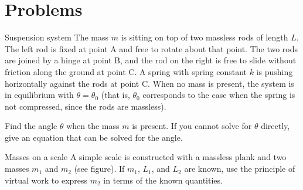 %
\section{Problems}
\begin{problem}{Suspension system}
The mass $m$ is sitting on top of two massless rods of length $L$. The left rod is fixed at point A and free to rotate about that point. The two rods are joined by a hinge at point B, and the rod on the right is free to slide without friction along the ground at point C. A spring with spring constant $k$ is pushing horizontally against the rods at point C. When no mass is present, the system is in equilibrium with $\theta= \theta_0$ (that is, $\theta_0$ corresponds to the case when the spring is not compressed, since the rods are massless).

Find the angle $\theta$ when the mass $m$ is present. If you cannot solve for $\theta$ directly, give an equation that can be solved for the angle.
\\
\label{prob_VirtWork_1}
\end{problem}

\begin{problem}{Masses on a scale}
A simple scale is constructed with a massless plank and two masses $m_1$ and $m_2$ (see figure). If $m_1$, $L_1$, and $L_2$ are known, use the principle of virtual work to express $m_2$ in terms of the known quantities.
\\
\label{prob_VirtWork_2}
\end{problem}

